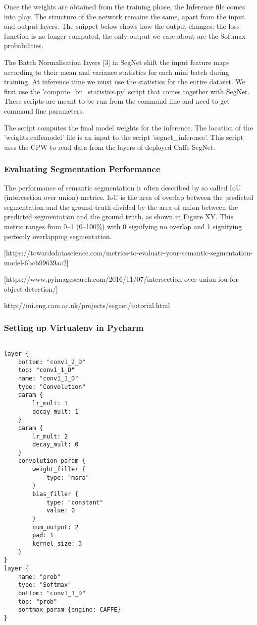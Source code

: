 Once the weights are obtained from the training phase, the Inference file comes into play. The structure of the network remains the same, apart from the input and output layers. The snippet below shows how the output changes: the loss function is no longer computed, the only output we care about are the Softmax probabilities. 

The Batch Normalisation layers [3] in SegNet shift the input feature maps according to their mean and variance statistics for each mini batch during training. At inference time we must use the statistics for the entire dataset. 
We first use the 'compute\_bn\_statistics.py' script that comes together with SegNet. These scripts are meant to be run from the command line and need to get command line parameters. 

The script computes the final model weights for the inference. The location of the 'weights.caffemodel' file is an input to the script 'segnet\_inference'. This script uses the CPW to read data from the layers of deployed Caffe SegNet. 

\subsubsection{Evaluating Segmentation Performance}

The performance of semantic segmentation is often described by so called IoU (intercestion over union) metrics. IoU is the area of overlap between the predicted segmentation and the ground truth divided by the area of union between the predicted segmentation and the ground truth, as shown in Figure XY. This metric ranges from 0–1 (0–100\%) with 0 signifying no overlap and 1 signifying perfectly overlapping segmentation.

[https://towardsdatascience.com/metrics-to-evaluate-your-semantic-segmentation-model-6bcb99639aa2]

[https://www.pyimagesearch.com/2016/11/07/intersection-over-union-iou-for-object-detection/]




http://mi.eng.cam.ac.uk/projects/segnet/tutorial.html

\subsubsection{Setting up Virtualenv in Pycharm}



\begin{lstlisting}

layer {
	bottom: "conv1_2_D"
	top: "conv1_1_D"
	name: "conv1_1_D"
	type: "Convolution"
	param {
		lr_mult: 1
		decay_mult: 1
	}
	param {
		lr_mult: 2
		decay_mult: 0
	}
	convolution_param {
		weight_filler {
			type: "msra"
		}
		bias_filler {
			type: "constant"
			value: 0
		}
		num_output: 2
		pad: 1
		kernel_size: 3
	}
}
layer {
	name: "prob"
	type: "Softmax"
	bottom: "conv1_1_D"
	top: "prob"
	softmax_param {engine: CAFFE}
}

\end{lstlisting}

